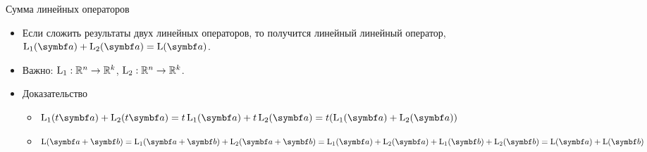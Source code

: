 \begin{frame}{Сумма линейных операторов}




\begin{itemize}[<+->]
    \item Если сложить результаты двух линейных операторов, 
    то получится линейный линейный оператор, $\LL_1(\ba) + \LL_2(\ba) = \LL(\ba)$. 
\item Важно: $\operatorname{L}_1 : \mathbb{R}^n \to \mathbb{R}^k$, $\operatorname{L}_2 : \mathbb{R}^n \to \mathbb{R}^k$.
    \item \alert{Доказательство}
\begin{itemize}
  \item $\LL_1(t\ba) + \LL_2(t\ba) = t\LL_1(\ba) + t\LL_2(\ba)=t(\LL_1(\ba) + \LL_2(\ba))$
  \item $\LL(\ba + \bb) = \LL_1(\ba + \bb) + \LL_2(\ba + \bb) = \LL_1(\ba ) + \LL_2(\ba ) + \LL_1( \bb) + \LL_2(\bb) = \LL(\ba) + \LL(\bb)$
\end{itemize}

\end{itemize}

    





\end{frame}

    